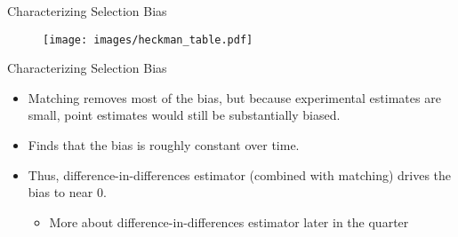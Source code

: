 \documentclass{beamer}
\numberwithin{equation}{section}
\begin{document}
\begin{frame}{Characterizing Selection Bias}

\begin{figure}[ht] \centering
    \texttt{[image: images/heckman\_table.pdf]}
\end{figure}

\end{frame}

\begin{frame}{Characterizing Selection Bias}

\begin{itemize}
\item
  Matching removes most of the bias, but because experimental estimates
  are small, point estimates would still be substantially biased.
  \frownie \pause
\item
  Finds that the bias is roughly constant over time. \pause
\item
  Thus, difference-in-differences estimator (combined with matching)
  drives the bias to near 0. \smiley 

  \begin{itemize}
  \itemsep1pt\parskip0pt
  \item
    More about difference-in-differences estimator later in the
quarter
  \end{itemize}
\end{itemize}

\end{frame}

%
%
%
%
%
\end{document}
